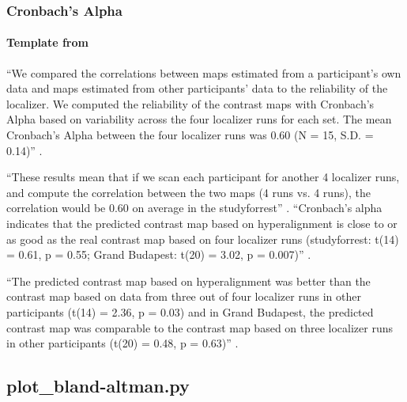 \subsubsection{Cronbach's Alpha}



\paragraph{Template from \citet{jiahui2020predicting}}
%
``We compared the correlations between maps estimated from a participant's own
data and maps estimated from other participants' data to the reliability of the
localizer.
%
We computed the reliability of the contrast maps with Cronbach's Alpha based on
variability across the four localizer runs for each set.
%
The mean Cronbach's Alpha between the four localizer runs was 0.60 (N = 15, S.D.
= 0.14)'' \citep{jiahui2020predicting}.

%
``These results mean that if we scan each participant for another 4 localizer
runs, and compute the correlation between the two maps (4 runs vs. 4 runs), the
correlation would be 0.60 on average in the studyforrest''
\citep{jiahui2020predicting}.
%
``Cronbach's alpha indicates that the predicted contrast map based on
hyperalignment is close to or as good as the real contrast map based on four
localizer runs (studyforrest: t(14) = 0.61, p = 0.55; Grand Budapest: t(20) =
3.02, p = 0.007)'' \citep{jiahui2020predicting}.

%
``The predicted contrast map based on hyperalignment was better than the
contrast map based on data from three out of four localizer runs in other
participants (t(14) = 2.36, p = 0.03) and in Grand Budapest, the predicted
contrast map was comparable to the contrast map based on three localizer runs in
other participants (t(20) = 0.48, p = 0.63)''
\citep{jiahui2020predicting}.


\subsection{plot\_bland-altman.py}



